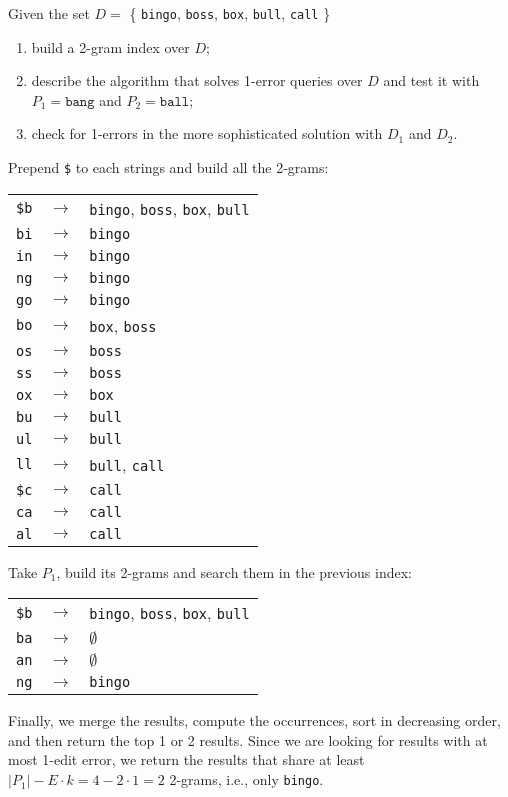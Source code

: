\exercise

Given the set $D =$ \{ \texttt{bingo}, \texttt{boss}, \texttt{box},
\texttt{bull}, \texttt{call} \}
%
\begin{enumerate}
  \item build a 2-gram index over $D$;
  \item describe the algorithm that solves 1-error queries over $D$ and test it
  with $P_1 = \texttt{bang}$ and $P_2 = \texttt{ball}$;
  \item check for 1-errors in the more sophisticated solution with $D_1$ and
  $D_2$.
\end{enumerate}

\solution

Prepend \texttt{\$} to each strings and build all the 2-grams:
%
\begin{longtable}{ccl}
  \texttt{\$b} & $\rightarrow$ & \texttt{bingo}, \texttt{boss},
  \texttt{box}, \texttt{bull} \\
  \texttt{bi} & $\rightarrow$ & \texttt{bingo} \\
  \texttt{in} & $\rightarrow$ & \texttt{bingo} \\
  \texttt{ng} & $\rightarrow$ & \texttt{bingo} \\
  \texttt{go} & $\rightarrow$ & \texttt{bingo} \\
  \texttt{bo} & $\rightarrow$ & \texttt{box}, \texttt{boss} \\
  \texttt{os} & $\rightarrow$ & \texttt{boss}\\
  \texttt{ss} & $\rightarrow$ & \texttt{boss} \\
  \texttt{ox} & $\rightarrow$ & \texttt{box} \\
  \texttt{bu} & $\rightarrow$ & \texttt{bull} \\
  \texttt{ul} & $\rightarrow$ & \texttt{bull} \\
  \texttt{ll} & $\rightarrow$ & \texttt{bull}, \texttt{call} \\
  \texttt{\$c} & $\rightarrow$ & \texttt{call} \\
  \texttt{ca} & $\rightarrow$ & \texttt{call} \\
  \texttt{al} & $\rightarrow$ & \texttt{call} \\
\end{longtable}
%
Take $P_1$, build its 2-grams and search them in the previous index:
%
\begin{longtable}{ccl}
  \texttt{\$b} & $\rightarrow$ & \texttt{bingo}, \texttt{boss},
  \texttt{box}, \texttt{bull} \\
  \texttt{ba} & $\rightarrow$ & $\emptyset$ \\
  \texttt{an} & $\rightarrow$ & $\emptyset$ \\
  \texttt{ng} & $\rightarrow$ & \texttt{bingo} \\
\end{longtable}
%
Finally, we merge the results, compute the occurrences, sort in decreasing
order, and then return the top 1 or 2 results. Since we are looking for results
with at most 1-edit error, we return the results that share at least $|P_1| -
E \cdot k = 4 - 2 \cdot 1 = 2$ 2-grams, i.e., only \texttt{bingo}.

